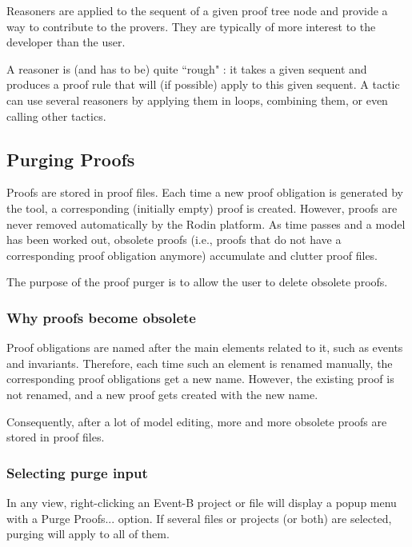 Reasoners are applied to the sequent of a given proof tree node and provide a way to contribute to the provers.  They are typically of more interest to the developer than the user. 

A reasoner is (and has to be) quite ``rough" : it takes a given sequent and produces a proof rule that will (if possible) apply to this given sequent. A tactic can use several reasoners by applying them in loops, combining them, or even calling other tactics.

\subsection{Purging Proofs}
\label{purging_proofs}

Proofs are stored in proof files. Each time a new proof obligation is generated by the tool, a corresponding (initially empty) proof is created. However, proofs are never removed automatically by the Rodin platform. As time passes and a model has been worked out, obsolete proofs (i.e., proofs that do not have a corresponding proof obligation anymore) accumulate and clutter proof files.

The purpose of the proof purger is to allow the user to delete obsolete proofs. 

\subsubsection{Why proofs become obsolete}
\label{obsolete_proof}

Proof obligations are named after the main elements related to it, such as events and invariants. Therefore, each time such an element is renamed manually, the corresponding proof obligations get a new name. However, the existing proof is not renamed, and a new proof gets created with the new name.

Consequently, after a lot of model editing, more and more obsolete proofs are stored in proof files.

\subsubsection{Selecting purge input}

In any view, right-clicking an Event-B project or file will display a popup menu with a \textsf{Purge Proofs...} option. If several files or projects (or both) are selected, purging will apply to all of them.

